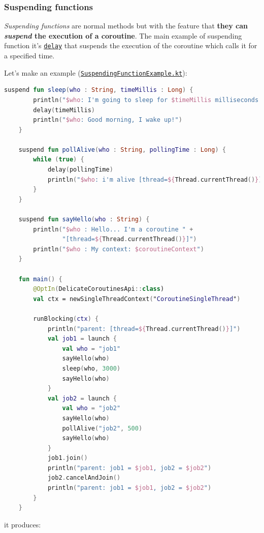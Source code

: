 \subsubsection{Suspending functions}

\textit{Suspending functions} are normal \Kotlin methods but with the feature that \textbf{they can \textit{suspend} the execution of a coroutine}. The main example of suspending function it's \href{https://kotlinlang.org/api/kotlinx.coroutines/kotlinx-coroutines-core/kotlinx.coroutines/delay.html}{\texttt{delay}} that suspends the execution of the coroutine which calls it for a specified time.

Let's make an example (\href{https://github.com/LM-96/Activity-Project-Operating-Systems-M-/blob/main/code/kotlin/unibo.apos.examples/src/main/kotlin/unibo/apos/examples/SuspendingFunctionExample.kt}{\texttt{SuspendingFunctionExample.kt}}):
\begin{lstlisting}[language=Kotlin]
	suspend fun sleep(who : String, timeMillis : Long) {
		println("$who: I'm going to sleep for $timeMillis milliseconds...")
		delay(timeMillis)
		println("$who: Good morning, I wake up!")
	}
	
	suspend fun pollAlive(who : String, pollingTime : Long) {
		while (true) {
			delay(pollingTime)
			println("$who: i'm alive [thread=${Thread.currentThread()}]")
		}
	}
	
	suspend fun sayHello(who : String) {
		println("$who : Hello... I'm a coroutine " +
				"[thread=${Thread.currentThread()}]")
		println("$who : My context: $coroutineContext")
	}
	
	fun main() {
		@OptIn(DelicateCoroutinesApi::class)
		val ctx = newSingleThreadContext("CoroutineSingleThread")
		
		runBlocking(ctx) {
			println("parent: [thread=${Thread.currentThread()}]")
			val job1 = launch {
				val who = "job1"
				sayHello(who)
				sleep(who, 3000)
				sayHello(who)
			}
			val job2 = launch {
				val who = "job2"
				sayHello(who)
				pollAlive("job2", 500)
				sayHello(who)
			}
			job1.join()
			println("parent: job1 = $job1, job2 = $job2")
			job2.cancelAndJoin()
			println("parent: job1 = $job1, job2 = $job2")
		}
	}
\end{lstlisting}
it produces:
